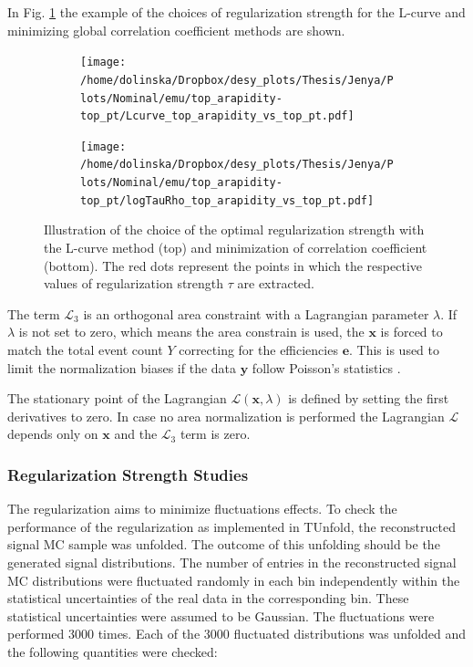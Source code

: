 In Fig. \ref{fig:reg_s_m} the example of the choices of regularization strength for the L-curve and minimizing global correlation coefficient 
methods are shown.

\begin{figure}[p]
\centering
\begin{subfigure}
  \centering
  \texttt{[image: /home/dolinska/Dropbox/desy\_plots/Thesis/Jenya/Plots/Nominal/emu/top\_arapidity-top\_pt/Lcurve\_top\_arapidity\_vs\_top\_pt.pdf]}
\end{subfigure}
\begin{subfigure}
  \centering
  \texttt{[image: /home/dolinska/Dropbox/desy\_plots/Thesis/Jenya/Plots/Nominal/emu/top\_arapidity-top\_pt/logTauRho\_top\_arapidity\_vs\_top\_pt.pdf]}
\end{subfigure}
\caption{Illustration of the choice of the optimal regularization strength with the L-curve method (top) and minimization of correlation coefficient
         (bottom). The red dots represent the points in which the respective values of regularization strength $\tau$ are extracted.}
\label{fig:reg_s_m}
\end{figure}

The term $\mathcal{L}_{3}$ is an orthogonal area constraint with a Lagrangian parameter $\lambda$. If $\lambda$ is not set to zero,
which means the area constrain is used, the $\mathbf{x}$ is forced to match the total event count $Y$ correcting for the efficiencies $\mathbf{e}$.
This is used to limit the normalization biases if the data $\mathbf{y}$ follow Poisson's statistics \cite{Cowan98}.

The stationary point of the Lagrangian $\mathcal{L}(\mathbf{x}, \lambda)$ is defined by setting the first derivatives to zero. In case no 
area normalization is performed the Lagrangian $\mathcal{L}$ depends only on $\mathbf{x}$ and the $\mathcal{L}_{3}$ term is zero.

\subsubsection{Regularization Strength Studies}

The regularization aims to minimize fluctuations effects. To check the performance of the regularization as implemented in TUnfold, the reconstructed signal
MC sample was unfolded. The outcome of this unfolding should be the generated signal distributions. The number of entries in the reconstructed signal
MC distributions were fluctuated randomly in each bin independently within the statistical uncertainties of the real data in the corresponding bin. 
These statistical uncertainties were assumed to be Gaussian. The fluctuations were performed 3000 times. Each of the 3000 fluctuated distributions 
was unfolded and the following quantities were checked:

